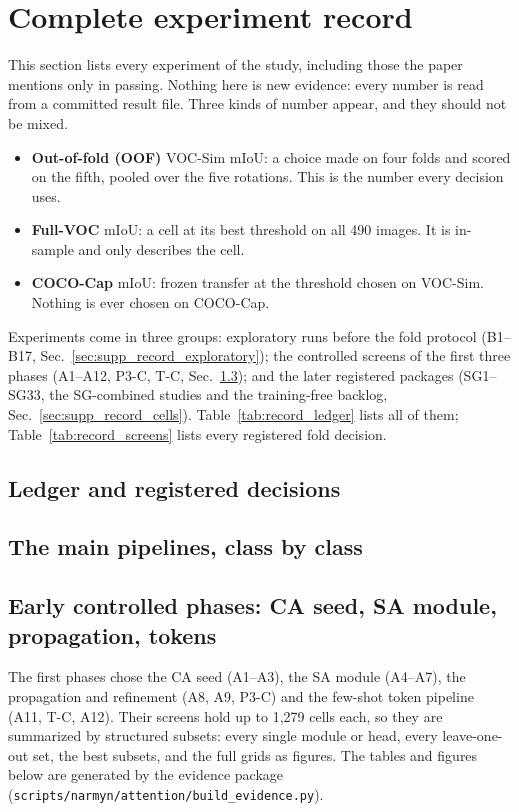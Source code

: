 \onecolumn
\section{Complete experiment record}
\label{sec:supp_record}
This section lists every experiment of the study, including those the paper mentions only in passing. Nothing here is new evidence: every number is read from a committed result file. Three kinds of number appear, and they should not be mixed.
\begin{itemize}
\item \textbf{Out-of-fold (OOF)} VOC-Sim mIoU: a choice made on four folds and scored on the fifth, pooled over the five rotations. This is the number every decision uses.
\item \textbf{Full-VOC} mIoU: a cell at its best threshold on all 490 images. It is in-sample and only describes the cell.
\item \textbf{COCO-Cap} mIoU: frozen transfer at the threshold chosen on VOC-Sim. Nothing is ever chosen on COCO-Cap.
\end{itemize}
Experiments come in three groups: exploratory runs before the fold protocol (B1--B17, Sec.~\ref{sec:supp_record_exploratory}); the controlled screens of the first three phases (A1--A12, P3-C, T-C, Sec.~\ref{sec:supp_record_early}); and the later registered packages (SG1--SG33, the SG-combined studies and the training-free backlog, Sec.~\ref{sec:supp_record_cells}). Table~\ref{tab:record_ledger} lists all of them; Table~\ref{tab:record_screens} lists every registered fold decision.

\subsection{Ledger and registered decisions}



\subsection{The main pipelines, class by class}


\subsection{Early controlled phases: CA seed, SA module, propagation, tokens}
\label{sec:supp_record_early}
The first phases chose the CA seed (A1--A3), the SA module (A4--A7), the propagation and refinement (A8, A9, P3-C) and the few-shot token pipeline (A11, T-C, A12). Their screens hold up to 1{,}279 cells each, so they are summarized by structured subsets: every single module or head, every leave-one-out set, the best subsets, and the full grids as figures. The tables and figures below are generated by the evidence package (\texttt{scripts/narmyn/attention/build\_evidence.py}).

